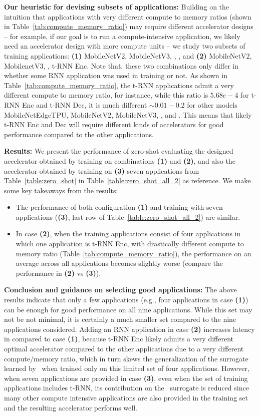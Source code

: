 {\textbf{Our heuristic for devising subsets of applications:} Building on the intuition that applications with very different compute to memory ratios (shown in Table~\ref{tab:compute_memory_ratio}) may require different accelerator designs -- for example, if our goal is to run a compute-intensive application, we likely need an accelerator design with more compute units -- we study two subsets of training applications: \textbf{(1)} MobileNetV2, MobileNetV3, \msix, \mfive, and \textbf{(2)} MobileNetV2, MobilenetV3, \mfive, t-RNN Enc.
%
Note that, these two combinations only differ in whether some RNN application was used in training or not.
%
As shown in Table~\ref{tab:compute_memory_ratio}, the t-RNN applications admit a very different compute to memory ratio, for instance, while this ratio is $5.68e-4$ for t-RNN Enc and t-RNN Dec, it is much different $\sim 0.01-0.2$ for other models MobileNetEdgeTPU, MobileNetV2, MobileNetV3, \mfive, and \msix. This means that likely t-RNN Enc and Dec will require different kinds of accelerators for good performance compared to the other applications.}

{\textbf{Results:} We present the performance of zero-shot evaluating the designed accelerator obtained by training on combinations \textbf{(1)} and \textbf{(2)}, and also the accelerator obtained by training on \textbf{(3)} seven applications from Table~\ref{table:zero_shot} in Table~\ref{table:zero_shot_all_2} as reference. We make some key takeaways from the results: 
}
\begin{itemize}
    \item The performance of both configuration \textbf{(1)} and training with seven applications (\textbf{(3)}, last row of Table~\ref{table:zero_shot_all_2}) are similar.
    \item In case \textbf{(2)}, when the training applications consist of four applications in which one application is t-RNN Enc, with drastically different compute to memory ratio (Table~\ref{tab:compute_memory_ratio}), the performance on an average across all applications becomes slightly worse (compare the performance in \textbf{(2)} vs \textbf{(3)}).
\end{itemize}

{\textbf{Conclusion and guidance on selecting good applications:} The above results indicate that only a few applications (e.g., four applications in case \textbf{(1)}) can be enough for good performance on all nine applications. While this set may not be not minimal, it is certainly a much smaller set compared to the nine applications considered.
Adding an RNN application in case \textbf{(2)} increases latency in compared to case \textbf{(1)}, because t-RNN Enc likely admits a very different optimal accelerator compared to the other applications due to a very different compute/memory ratio, which in turn skews the generalization of the surrogate learned by \primemethodname\ when trained only on this limited set of four applications. However, when seven applications are provided in case \textbf{(3)}, even when the set of training applications includes t-RNN, its contribution on the \primemethodname\ surrogate is reduced since many other compute intensive applications are also provided in the training set and the resulting accelerator performs well.}
%

